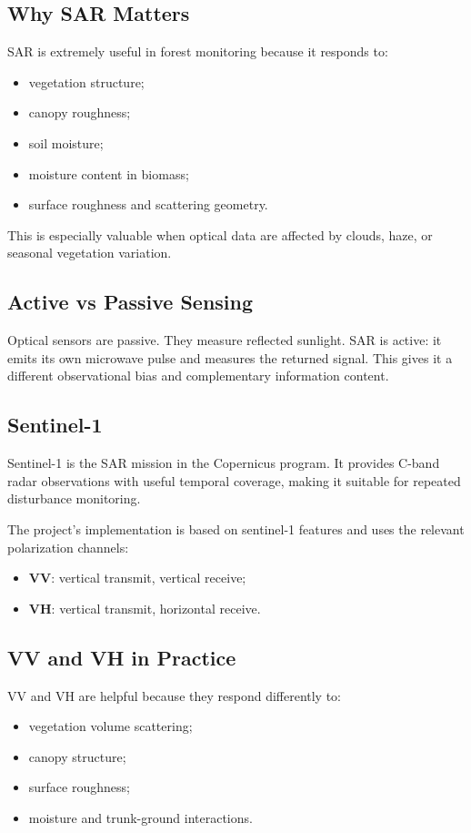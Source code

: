 \documentclass[11pt]{article}
\begin{document}
\subsection{Why SAR Matters}
SAR is extremely useful in forest monitoring because it responds to:
\begin{itemize}
    \item vegetation structure;
    \item canopy roughness;
    \item soil moisture;
    \item moisture content in biomass;
    \item surface roughness and scattering geometry.
\end{itemize}

This is especially valuable when optical data are affected by clouds, haze, or seasonal vegetation variation.

\subsection{Active vs Passive Sensing}
Optical sensors are passive. They measure reflected sunlight. SAR is active: it emits its own microwave pulse and measures the returned signal. This gives it a different observational bias and complementary information content.

\subsection{Sentinel-1}
Sentinel-1 is the SAR mission in the Copernicus program. It provides C-band radar observations with useful temporal coverage, making it suitable for repeated disturbance monitoring.

The project’s implementation is based on sentinel-1 features and uses the relevant polarization channels:
\begin{itemize}
    \item \textbf{VV}: vertical transmit, vertical receive;
    \item \textbf{VH}: vertical transmit, horizontal receive.
\end{itemize}

\subsection{VV and VH in Practice}
VV and VH are helpful because they respond differently to:
\begin{itemize}
    \item vegetation volume scattering;
    \item canopy structure;
    \item surface roughness;
    \item moisture and trunk-ground interactions.
\end{itemize}
\end{document}
